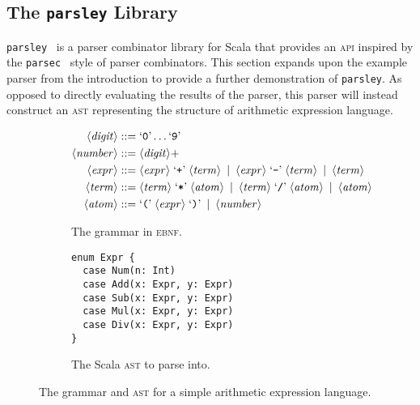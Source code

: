 \documentclass[../../main.tex]{subfiles}
\begin{document}
\subsection{The \texttt{parsley} Library}
\texttt{parsley}~\cite{willis_garnishing_2018} is a parser combinator library for Scala that provides an \textsc{api} inspired by the \texttt{parsec}~\cite{leijen_parsec_2001} style of parser combinators.
This section expands upon the example parser from the introduction to provide a further demonstration of \texttt{parsley}.
As opposed to directly evaluating the results of the parser, this parser will instead construct an \textsc{ast} representing the structure of arithmetic expression language.

\begin{figure}[htbp]
\centering
\begin{subfigure}{0.575\textwidth}
\vspace{3ex}
\centering
\begin{align*}
\langle \mathit{digit} \rangle &::= \text{`\texttt{0}'} \ldots \text{`\texttt{9}'} \\
\langle \mathit{number} \rangle &::= \langle \mathit{digit} \rangle+ \\
\langle \mathit{expr} \rangle &::= \langle \mathit{expr} \rangle \; \text{`\texttt{+}'} \; \langle \mathit{term} \rangle \enspace | \enspace
                                \langle \mathit{expr} \rangle \; \text{`\texttt{-}'} \; \langle \mathit{term} \rangle \enspace | \enspace
                                \langle \mathit{term} \rangle \\
\langle \mathit{term} \rangle &::= \langle \mathit{term} \rangle \; \text{`\texttt{*}'} \; \langle \mathit{atom} \rangle \enspace | \enspace
                                \langle \mathit{term} \rangle \; \text{`\texttt{/}'} \; \langle \mathit{atom} \rangle \enspace | \enspace
                                \langle \mathit{atom} \rangle \\
\langle \mathit{atom} \rangle &::= \text{`\texttt{(}'} \; \langle \mathit{expr} \rangle \; \text{`\texttt{)}'} \enspace | \enspace
                                \langle \mathit{number} \rangle
\end{align*}
\caption{The grammar in \textsc{ebnf}.}
\label{fig:simple-grammar-ebnf}
\end{subfigure}
\hfill
\begin{subfigure}{0.325\textwidth}
\vspace{5ex}
\centering
\begin{verbatim}
enum Expr {
  case Num(n: Int)
  case Add(x: Expr, y: Expr)
  case Sub(x: Expr, y: Expr)
  case Mul(x: Expr, y: Expr)
  case Div(x: Expr, y: Expr)
}
\end{verbatim}
\caption{The Scala \textsc{ast} to parse into.}
\label{fig:simple-grammar-ast}
\end{subfigure}
\caption{The grammar and \textsc{ast} for a simple arithmetic expression language.}
\end{figure}
\end{document}
